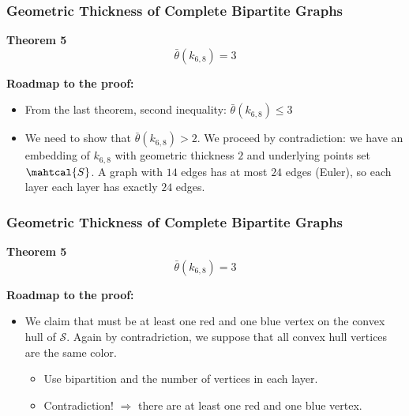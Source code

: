 \documentclass[12 pt]{beamer}
\begin{document}
\begin{frame}{}
    \frametitle{Geometric Thickness of Complete Bipartite Graphs}
    
    \begin{block}{\textbf{Theorem 5}}
    $$\bar{\theta} (k_{6,8}) = 3$$
    \end{block}
    
    \pause
    
    \textbf{Roadmap to the proof:}
    
    \begin{itemize}
    \item From the last theorem, second inequality: $\bar{\theta} (k_{6,8}) \leq 3$
    \item <2-> We need to show that $\bar{\theta} (k_{6,8}) > 2$. We proceed by contradiction: we have an embedding of $k_{6,8}$ with geometric thickness $2$ and underlying points set $\mahtcal{S}$.
    A graph with $14$ edges has at most $24$ edges (Euler), so each layer each layer has exactly $24$ edges.
    \end{itemize}
    \end{frame}

\begin{frame}{}
    \frametitle{Geometric Thickness of Complete Bipartite Graphs}
    
    \begin{block}{\textbf{Theorem 5}}
    $$\bar{\theta} (k_{6,8}) = 3$$
    \end{block}
    
    \textbf{Roadmap to the proof:}    
    
    \begin{itemize}
    \item We claim that must be at least one red and one blue vertex on the convex hull of $\mathcal{S}$. Again by contradriction, we suppose that all convex hull vertices are the same color.
    
        \begin{itemize}
            \item Use bipartition and the number of vertices in each layer.
            \item Contradiction! $\Rightarrow$ there are at least one red and one blue vertex.
        \end{itemize}
    \end{itemize}
\end{frame}
    
\end{document}
